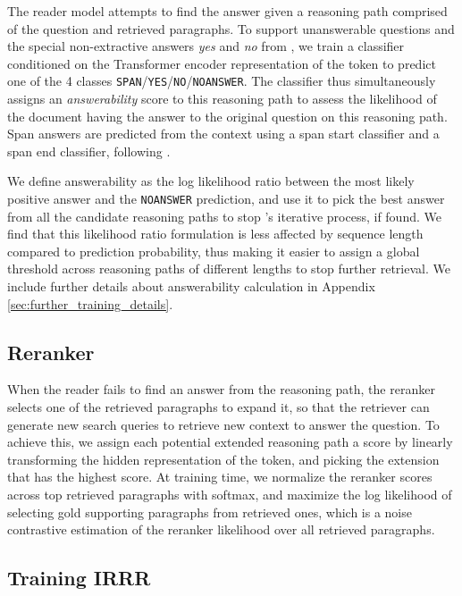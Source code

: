 The reader model attempts to find the answer given a reasoning path comprised of the question and retrieved paragraphs. 
To support unanswerable questions and the special non-extractive answers  \emph{yes} and \emph{no} from \hotpotqa{}, we train a classifier conditioned on the Transformer encoder representation of the \clstoken{} token to predict one of the 4 classes \texttt{SPAN}\slash \texttt{YES}\slash\texttt{NO}\slash\texttt{NOANSWER}. The classifier thus simultaneously assigns an \emph{answerability} score to this reasoning path to assess the likelihood of the document having the answer to the original question on this reasoning path.
Span answers are predicted from the context using a span start classifier and a span end classifier, following \citet{devlin2019bert}.

We define answerability as the log likelihood ratio between the most likely positive answer and the \texttt{NOANSWER} prediction, and use it to pick the best answer from all the candidate reasoning paths to stop \irrr{}'s iterative process, if found. 
We find that this likelihood ratio formulation is less affected by sequence length compared to prediction probability, thus making it easier to assign a global threshold across reasoning paths of different lengths to stop further retrieval.
We include further details about answerability calculation in Appendix \ref{sec:further_training_details}.

\subsection{Reranker}

When the reader fails to find an answer from the reasoning path, the reranker selects one of the retrieved paragraphs to expand it, so that the retriever can generate new search queries to retrieve new context to answer the question.
To achieve this, we assign each potential extended reasoning path a score by linearly transforming the hidden representation of the \clstoken{} token, and picking the extension that has the highest score.
At training time, we normalize the reranker scores across top retrieved paragraphs with softmax, and maximize the log likelihood of selecting gold supporting paragraphs from retrieved ones, which is a noise contrastive estimation \citep[NCE;][]{mnih2013learning, jean2015using} of the reranker likelihood over all retrieved paragraphs.

\subsection{Training IRRR}

